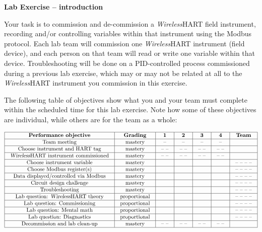 

\noindent
{\bf Lab Exercise -- introduction}

\vskip 5pt

Your task is to commission and de-commission a {\sl Wireless}HART field instrument, recording and/or controlling variables within that instrument using the Modbus protocol.  Each lab team will commission one {\sl Wireless}HART instrument (field device), and each person on that team will read or write one variable within that device.  Troubleshooting will be done on a PID-controlled process commissioned during a previous lab exercise, which may or may not be related at all to the {\sl Wireless}HART instrument you commission in this exercise.

The following table of objectives show what you and your team must complete within the scheduled time for this lab exercise.  Note how some of these objectives are individual, while others are for the team as a whole:



$$\vbox{\offinterlineskip
\halign{\strut
\vrule \quad\hfil # \ \hfil & 
\vrule \quad\hfil # \ \hfil & 
\vrule \quad\hfil # \ \hfil & 
\vrule \quad\hfil # \ \hfil & 
\vrule \quad\hfil # \ \hfil & 
\vrule \quad\hfil # \ \hfil & 
\vrule \quad\hfil # \ \hfil \vrule \cr
\noalign{\hrule}
%
{\bf Performance objective} & {\bf Grading} & {\bf 1} & {\bf 2} & {\bf 3} & {\bf 4} & {\bf Team} \cr
%
\noalign{\hrule}
%
Team meeting & mastery & -- & -- & -- & -- & \cr
%
\noalign{\hrule}
%
Choose instrument and HART tag & mastery & -- -- & -- -- & -- -- & -- -- &  \cr
%
\noalign{\hrule}
%
{\sl Wireless}HART instrument commissioned & mastery & -- -- & -- -- & -- -- & -- -- &  \cr
%
\noalign{\hrule}
%
Choose instrument variable & mastery & & & & & -- -- -- -- \cr
%
\noalign{\hrule}
%
Choose Modbus register(s) & mastery & & & & & -- -- -- -- \cr
%
\noalign{\hrule}
%
Data displayed/controlled via Modbus & mastery &  &  &  &  & -- -- -- -- \cr
%
\noalign{\hrule}
%
Circuit design challenge & mastery & & & & & -- -- -- -- \cr
%
\noalign{\hrule}
%
Troubleshooting & mastery & & & & & -- -- -- -- \cr
%
\noalign{\hrule}
%
Lab question: {\sl Wireless}HART theory & proportional &  &  &  &  & -- -- -- -- \cr
%
\noalign{\hrule}
%
Lab question: Commissioning & proportional &  &  &  &  & -- -- -- -- \cr
%
\noalign{\hrule}
%
Lab question: Mental math & proportional &  &  &  &  & -- -- -- -- \cr
%
\noalign{\hrule}
%
Lab question: Diagnostics & proportional &  &  &  &  & -- -- -- -- \cr
%
\noalign{\hrule}
%
Decommission and lab clean-up & mastery & -- -- & -- -- & -- -- & -- -- &  \cr
%
\noalign{\hrule}
} %
}$$ %

